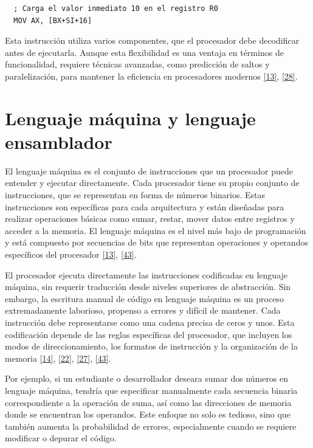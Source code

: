 \documentclass[12pt,oneside]{templates/unerthesis}
\begin{document}
\begin{lstlisting}
  ; Carga el valor inmediato 10 en el registro R0
  MOV AX, [BX+SI+16]
  \end{lstlisting}

Esta instrucción utiliza varios componentes, que el procesador debe decodificar antes de ejecutarla. Aunque esta flexibilidad es una ventaja en términos de funcionalidad, requiere técnicas avanzadas, como predicción de saltos y paralelización, para mantener la eficiencia en procesadores modernos \protect\hyperlink{ref-hennessy2017computer}{{[}13{]}}, \protect\hyperlink{ref-patterson_computer_2014}{{[}28{]}}.

\hypertarget{lenguaje-muxe1quina-y-lenguaje-ensamblador}{%
\section{Lenguaje máquina y lenguaje ensamblador}\label{lenguaje-muxe1quina-y-lenguaje-ensamblador}}

El lenguaje máquina es el conjunto de instrucciones que un procesador puede entender y ejecutar directamente. Cada procesador tiene su propio conjunto de instrucciones, que se representan en forma de números binarios. Estas instrucciones son específicas para cada arquitectura y están diseñadas para realizar operaciones básicas como sumar, restar, mover datos entre registros y acceder a la memoria. El lenguaje máquina es el nivel más bajo de programación y está compuesto por secuencias de bits que representan operaciones y operandos específicos del procesador
\protect\hyperlink{ref-hennessy2017computer}{{[}13{]}}, \protect\hyperlink{ref-irvine2011assembly}{{[}43{]}}.

El procesador ejecuta directamente las instrucciones codificadas en lenguaje máquina, sin requerir traducción desde niveles superiores de abstracción. Sin embargo, la escritura manual de código en lenguaje máquina es un proceso extremadamente laborioso, propenso a errores y difícil de mantener. Cada instrucción debe representarse como una cadena precisa de ceros y unos. Esta codificación depende de las reglas específicas del procesador, que incluyen los modos de direccionamiento, los formatos de instrucción y la organización de la memoria \protect\hyperlink{ref-stallings_computer_2021}{{[}14{]}}, \protect\hyperlink{ref-tanenbaum_structured_2016}{{[}22{]}}, \protect\hyperlink{ref-null_essentials_2014}{{[}27{]}}, \protect\hyperlink{ref-irvine2011assembly}{{[}43{]}}.

Por ejemplo, si un estudiante o desarrollador deseara sumar dos números en lenguaje máquina, tendría que especificar manualmente cada secuencia binaria correspondiente a la operación de suma, así como las direcciones de memoria donde se encuentran los operandos. Este enfoque no solo es tedioso, sino que también aumenta la probabilidad de errores, especialmente cuando se requiere modificar o depurar el código.
\end{document}
